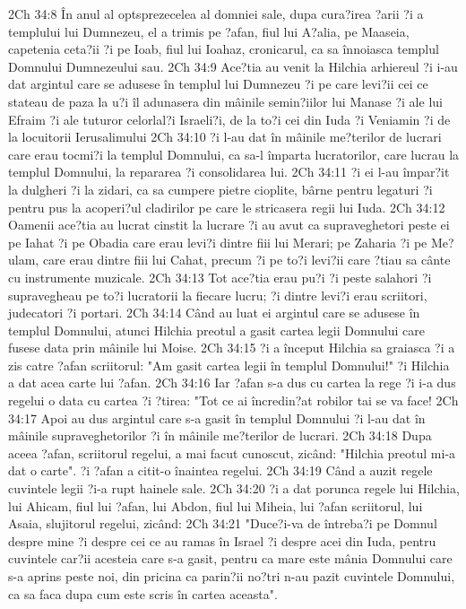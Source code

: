 2Ch 34:8  În anul al optsprezecelea al domniei sale, dupa cura?irea ?arii ?i a templului lui Dumnezeu, el a trimis pe ?afan, fiul lui A?alia, pe Maaseia, capetenia ceta?ii ?i pe Ioab, fiul lui Ioahaz, cronicarul, ca sa înnoiasca templul Domnului Dumnezeului sau.
2Ch 34:9  Ace?tia au venit la Hilchia arhiereul ?i i-au dat argintul care se adusese în templul lui Dumnezeu ?i pe care levi?ii cei ce stateau de paza la u?i îl adunasera din mâinile semin?iilor lui Manase ?i ale lui Efraim ?i ale tuturor celorlal?i Israeli?i, de la to?i cei din Iuda ?i Veniamin ?i de la locuitorii Ierusalimului
2Ch 34:10  ?i l-au dat în mâinile me?terilor de lucrari care erau tocmi?i la templul Domnului, ca sa-l împarta lucratorilor, care lucrau la templul Domnului, la repararea ?i consolidarea lui.
2Ch 34:11  ?i ei l-au împar?it la dulgheri ?i la zidari, ca sa cumpere pietre cioplite, bârne pentru legaturi ?i pentru pus la acoperi?ul cladirilor pe care le stricasera regii lui Iuda.
2Ch 34:12  Oamenii ace?tia au lucrat cinstit la lucrare ?i au avut ca supraveghetori peste ei pe Iahat ?i pe Obadia care erau levi?i dintre fiii lui Merari; pe Zaharia ?i pe Me?ulam, care erau dintre fiii lui Cahat, precum ?i pe to?i levi?ii care ?tiau sa cânte cu instrumente muzicale.
2Ch 34:13  Tot ace?tia erau pu?i ?i peste salahori ?i supravegheau pe to?i lucratorii la fiecare lucru; ?i dintre levi?i erau scriitori, judecatori ?i portari.
2Ch 34:14  Când au luat ei argintul care se adusese în templul Domnului, atunci Hilchia preotul a gasit cartea legii Domnului care fusese data prin mâinile lui Moise.
2Ch 34:15  ?i a început Hilchia sa graiasca ?i a zis catre ?afan scriitorul: "Am gasit cartea legii în templul Domnului!" ?i Hilchia a dat acea carte lui ?afan.
2Ch 34:16  Iar ?afan s-a dus cu cartea la rege ?i i-a dus regelui o data cu cartea ?i ?tirea: "Tot ce ai încredin?at robilor tai se va face!
2Ch 34:17  Apoi au dus argintul care s-a gasit în templul Domnului ?i l-au dat în mâinile supraveghetorilor ?i în mâinile me?terilor de lucrari.
2Ch 34:18  Dupa aceea ?afan, scriitorul regelui, a mai facut cunoscut, zicând: "Hilchia preotul mi-a dat o carte". ?i ?afan a citit-o înaintea regelui.
2Ch 34:19  Când a auzit regele cuvintele legii ?i-a rupt hainele sale.
2Ch 34:20  ?i a dat porunca regele lui Hilchia, lui Ahicam, fiul lui ?afan, lui Abdon, fiul lui Miheia, lui ?afan scriitorul, lui Asaia, slujitorul regelui, zicând:
2Ch 34:21  "Duce?i-va de întreba?i pe Domnul despre mine ?i despre cei ce au ramas în Israel ?i despre acei din Iuda, pentru cuvintele car?ii acesteia care s-a gasit, pentru ca mare este mânia Domnului care s-a aprins peste noi, din pricina ca parin?ii no?tri n-au pazit cuvintele Domnului, ca sa faca dupa cum este scris în cartea aceasta".
